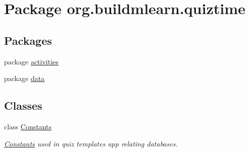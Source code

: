 \hypertarget{namespaceorg_1_1buildmlearn_1_1quiztime}{}\section{Package org.\+buildmlearn.\+quiztime}
\label{namespaceorg_1_1buildmlearn_1_1quiztime}
\subsection*{Packages}
\begin{DoxyCompactItemize}
\item 
package \hyperlink{namespaceorg_1_1buildmlearn_1_1quiztime_1_1activities}{activities}
\item 
package \hyperlink{namespaceorg_1_1buildmlearn_1_1quiztime_1_1data}{data}
\end{DoxyCompactItemize}
\subsection*{Classes}
\begin{DoxyCompactItemize}
\item 
class \hyperlink{classorg_1_1buildmlearn_1_1quiztime_1_1Constants}{Constants}
\begin{DoxyCompactList}\small\item\em \hyperlink{classorg_1_1buildmlearn_1_1quiztime_1_1Constants}{Constants} used in quiz template\textquotesingle{}s app relating databases. \end{DoxyCompactList}\end{DoxyCompactItemize}
